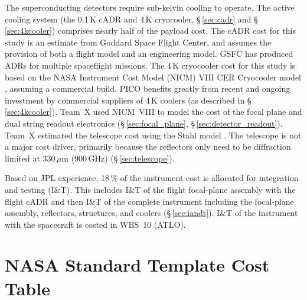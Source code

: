The superconducting detectors require sub-kelvin cooling to
operate. The active cooling system (the 0.1\,K cADR and 4\,K
cryocooler, \S\,\ref{sec:cadr} and \S\,\ref{sec:4kcooler}) comprises nearly half of the payload
cost. The cADR cost for this study is an estimate from Goddard
Space Flight Center, and assumes the provision of both a flight
model and an engineering model. GSFC has produced ADRs for multiple
spaceflight missions. The 4\,K cryocooler cost for this study is based
on the NASA Instrument Cost Model (NICM) VIII CER Cryocooler model
\cite{Mrozinski2017}, assuming a commercial build. PICO benefits
greatly from recent and ongoing investment by commercial suppliers of
4\,K coolers (as described in \S\,\ref{sec:4kcooler}).  Team~X used NICM~VIII to model
the cost of the focal plane and dual string readout electronics (\S\,\ref{sec:focal_plane},
\S\,\ref{sec:detector_readout}).  Team~X estimated the telescope cost using the Stahl model
\cite{Stahl2016}. The telescope is not a major cost driver, primarily
because the reflectors only need to be diffraction limited at 330\,$\mu$m
(900\,GHz) (\S\,\ref{sec:telescope}).

Based on JPL experience, 18\,\% of the instrument cost is allocated for integration and testing (I\&T). This includes I\&T of the flight focal-plane assembly with the flight cADR and then I\&T of the complete instrument including the focal-plane assembly, reflectors, structures, and coolers (\S\,\ref{sec:iandt}). I\&T of the instrument with the spacecraft is costed in WBS~10 (ATLO).

\newpage


\section*{NASA Standard Template Cost Table}

